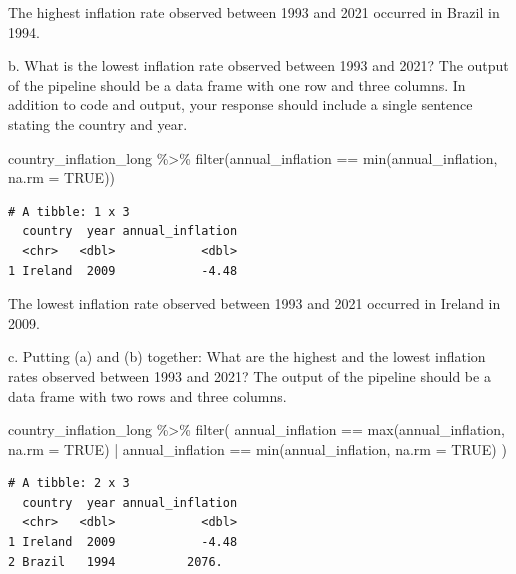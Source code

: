 \documentclass[
  letterpaper,
  DIV=11,
  numbers=noendperiod]{scrartcl}
\newenvironment{Shaded}{\begin{snugshade}}{\end{snugshade}}
\newcommand{\AttributeTok}[1]{\textcolor[rgb]{0.40,0.45,0.13}{#1}}
\newcommand{\ConstantTok}[1]{\textcolor[rgb]{0.56,0.35,0.01}{#1}}
\newcommand{\FunctionTok}[1]{\textcolor[rgb]{0.28,0.35,0.67}{#1}}
\newcommand{\NormalTok}[1]{\textcolor[rgb]{0.00,0.23,0.31}{#1}}
\newcommand{\SpecialCharTok}[1]{\textcolor[rgb]{0.37,0.37,0.37}{#1}}
\begin{document}
The highest inflation rate observed between 1993 and 2021 occurred in
Brazil in 1994.

b. What is the lowest inflation rate observed between 1993 and 2021? The
output of the pipeline should be a data frame with one row and three
columns. In addition to code and output, your response should include a
single sentence stating the country and year.

\begin{Shaded}
\begin{Highlighting}[]
\NormalTok{country\_inflation\_long }\SpecialCharTok{\%\textgreater{}\%}
  \FunctionTok{filter}\NormalTok{(annual\_inflation }\SpecialCharTok{==} \FunctionTok{min}\NormalTok{(annual\_inflation, }\AttributeTok{na.rm =} \ConstantTok{TRUE}\NormalTok{))}
\end{Highlighting}
\end{Shaded}

\begin{verbatim}
# A tibble: 1 x 3
  country  year annual_inflation
  <chr>   <dbl>            <dbl>
1 Ireland  2009            -4.48
\end{verbatim}

The lowest inflation rate observed between 1993 and 2021 occurred in
Ireland in 2009.

c. Putting (a) and (b) together: What are the highest and the lowest
inflation rates observed between 1993 and 2021? The output of the
pipeline should be a data frame with two rows and three columns.

\begin{Shaded}
\begin{Highlighting}[]
\NormalTok{country\_inflation\_long }\SpecialCharTok{\%\textgreater{}\%}
  \FunctionTok{filter}\NormalTok{(}
\NormalTok{    annual\_inflation }\SpecialCharTok{==} \FunctionTok{max}\NormalTok{(annual\_inflation, }\AttributeTok{na.rm =} \ConstantTok{TRUE}\NormalTok{) }\SpecialCharTok{|}
\NormalTok{    annual\_inflation }\SpecialCharTok{==} \FunctionTok{min}\NormalTok{(annual\_inflation, }\AttributeTok{na.rm =} \ConstantTok{TRUE}\NormalTok{)}
\NormalTok{  )}
\end{Highlighting}
\end{Shaded}

\begin{verbatim}
# A tibble: 2 x 3
  country  year annual_inflation
  <chr>   <dbl>            <dbl>
1 Ireland  2009            -4.48
2 Brazil   1994          2076.  
\end{verbatim}
\end{document}
